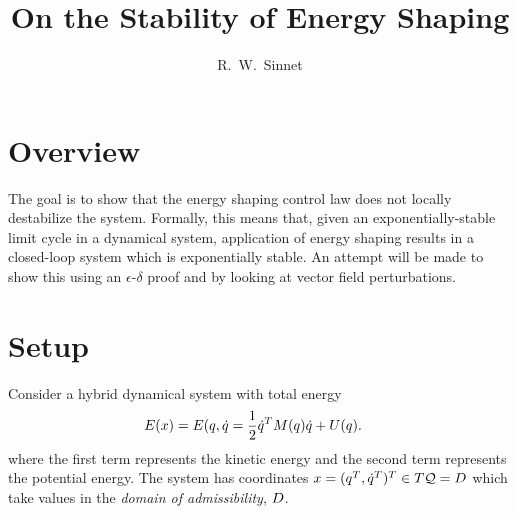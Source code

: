 \documentclass[twocolumn]{article}
\author{R.~W.~Sinnet}
\title{On the Stability of Energy Shaping}
\begin{document}
\maketitle
\thispagestyle{fancy}

\section*{Overview}
The goal is to show that the energy shaping control law does not locally destabilize the system.
%
Formally, this means that, given an exponentially-stable limit cycle in a dynamical system, application of energy shaping results in a closed-loop system which is exponentially stable.
%
An attempt will be made to show this using an $\epsilon$-$\delta$ proof and by looking at vector field perturbations.

\section{Setup}

Consider a hybrid dynamical system with total energy
\begin{align*}
  E(x) &= E(q, \dot{q} = \frac{1}{2} \dot{q}^{T} M(q) \dot{q} + U(q).
\end{align*}
where the first term represents the kinetic energy and the second term represents the potential energy.
%
The system has coordinates $x = (q^T, \dot{q}^T)^T \in T\mathcal{Q} = D$ which take values in the {\em domain of admissibility}, $D$.
\end{document}
